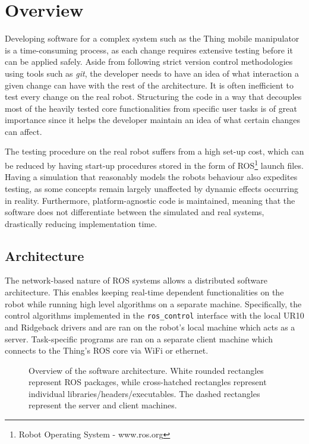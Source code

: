 \documentclass[times, utf8, diplomski, english]{fer}
\begin{document}
\section{Overview}\label{section:overview}
Developing software for a complex system such as the Thing mobile manipulator is a time-consuming process, as each change requires extensive testing before it can be applied safely.
Aside from following strict version control methodologies using tools such as \textit{git}, the developer needs to have an idea of what interaction a given change can have with the rest of the architecture. 
It is often inefficient to test every change on the real robot.
Structuring the code in a way that decouples most of the heavily tested core functionalities from specific user tasks is of great importance since it helps the developer maintain an idea of what certain changes can affect.

The testing procedure on the real robot suffers from a high set-up cost, which can be reduced by having start-up procedures stored in the form of ROS\footnote{Robot Operating System - www.ros.org} launch files.
Having a simulation that reasonably models the robots behaviour also expedites testing, as some concepts remain largely unaffected by dynamic effects occurring in reality.
Furthermore, platform-agnostic code is maintained, meaning that the software does not differentiate between the simulated and real systems, drastically reducing implementation time.
\subsection{Architecture}
The network-based nature of ROS systems allows a distributed software architecture.
This enables keeping real-time dependent functionalities on the robot while running high level algorithms on a separate machine.
Specifically, the control algorithms implemented in the \verb|ros_control| interface with the local UR10 and Ridgeback drivers and are ran on the robot's local machine which acts as a server.
Task-specific programs are ran on a separate client machine which connects to the Thing's ROS core via WiFi or ethernet.
\begin{figure}

\caption{Overview of the software architecture. White rounded rectangles represent ROS packages, while cross-hatched rectangles represent individual libraries/headers/executables. The dashed rectangles represent the server and client machines.}
\label{fig:overview}
\end{figure} 
\end{document}
